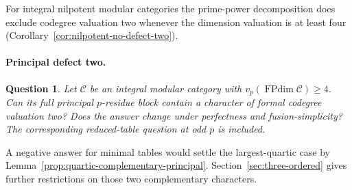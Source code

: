\documentclass[11pt,a4paper]{article}
\numberwithin{equation}{section}
\newtheorem{question}[theorem]{Question}
\theoremstyle{remark}
\newcommand{\FPdim}{\operatorname{FPdim}}
\begin{document}
For integral nilpotent modular categories the prime-power decomposition
does exclude codegree valuation two whenever the dimension valuation is
at least four (Corollary~\ref{cor:nilpotent-no-defect-two}).
\paragraph{Principal defect two.}
\begin{question}\label{fam:M:5.12}\label{q:principal-defect-two}
Let $\mathcal C$ be an integral modular category with
$v_p(\FPdim\mathcal C)\ge4$. Can its full principal $p$-residue
block contain a character of formal codegree valuation two?
Does the answer change under perfectness and fusion-simplicity?
The corresponding reduced-table question at odd $p$ is included.
\end{question}
A negative answer for minimal tables would settle the largest-quartic
case by Lemma~\ref{prop:quartic-complementary-principal}. Section~\ref{sec:three-ordered}
gives further restrictions on those two complementary characters.
\end{document}
